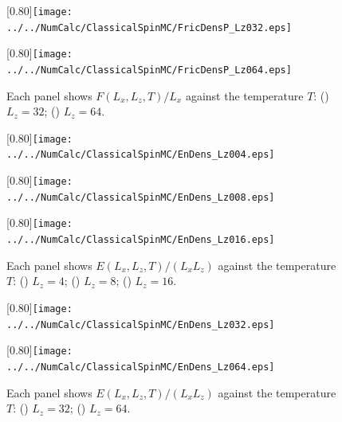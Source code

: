 \begin{figure}[htbp]
	\centering
	\subcaptionbox{\label{fig:ffdcheckfor032}}[0.80\linewidth]{\texttt{[image: ../../NumCalc/ClassicalSpinMC/FricDensP\_Lz032.eps]}}
	
	\subcaptionbox{\label{fig:ffdcheckfor064}}[0.80\linewidth]{\texttt{[image: ../../NumCalc/ClassicalSpinMC/FricDensP\_Lz064.eps]}}
	
	\caption{Each panel shows $F(L_{x}, L_{z}, T)/L_{x}$ against the temperature $T$: () $L_{z}=32$; () $L_{z}=64$.}
	\label{fig:ffdcheck2}
\end{figure}

\begin{figure}[htbp]
	\centering
	\subcaptionbox{\label{fig:ebcheckfor004}}[0.80\linewidth]{\texttt{[image: ../../NumCalc/ClassicalSpinMC/EnDens\_Lz004.eps]}}
	
	\subcaptionbox{\label{fig:ebcheckfor008}}[0.80\linewidth]{\texttt{[image: ../../NumCalc/ClassicalSpinMC/EnDens\_Lz008.eps]}}
	
	\subcaptionbox{\label{fig:ebcheckfor016}}[0.80\linewidth]{\texttt{[image: ../../NumCalc/ClassicalSpinMC/EnDens\_Lz016.eps]}}
	
	\caption{Each panel shows $E(L_{x}, L_{z}, T)/(L_{x}L_{z})$ against the temperature $T$: () $L_{z}=4$; () $L_{z}=8$; () $L_{z}=16$.}
	\label{fig:ebcheck1}
\end{figure}

\begin{figure}[htbp]
	\centering
	\subcaptionbox{\label{fig:ebcheckfor032}}[0.80\linewidth]{\texttt{[image: ../../NumCalc/ClassicalSpinMC/EnDens\_Lz032.eps]}}
	
	\subcaptionbox{\label{fig:ebcheckfor064}}[0.80\linewidth]{\texttt{[image: ../../NumCalc/ClassicalSpinMC/EnDens\_Lz064.eps]}}
	
	\caption{Each panel shows $E(L_{x}, L_{z}, T)/(L_{x}L_{z})$ against the temperature $T$: () $L_{z}=32$; () $L_{z}=64$.}
	\label{fig:ebcheck2}
\end{figure}

